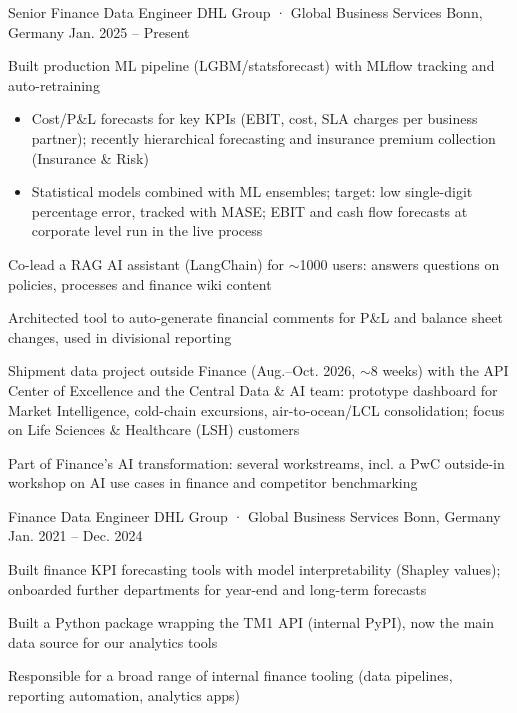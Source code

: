 \documentclass[11pt, a4paper]{awesome-cv}
\begin{document}
\makecvheader


\begin{cventries}
\cventry
  {Senior Finance Data Engineer}
  {DHL Group · Global Business Services}
  {Bonn, Germany}
  {Jan. 2025 -- Present}
  {
    \begin{cvitems}
      \item {Built production ML pipeline (LGBM/statsforecast) with MLflow tracking and auto-retraining}
        \begin{itemize}
          \item{Cost/P\&L forecasts for key KPIs (EBIT, cost, SLA charges per business partner); recently hierarchical forecasting and insurance premium collection (Insurance \& Risk)}
          \item{Statistical models combined with ML ensembles; target: low single-digit percentage error, tracked with MASE; EBIT and cash flow forecasts at corporate level run in the live process}
        \end{itemize}
      \item {Co-lead a RAG AI assistant (LangChain) for $\sim$1000 users: answers questions on policies, processes and finance wiki content}
      \item {Architected tool to auto-generate financial comments for P\&L and balance sheet changes, used in divisional reporting}
      \item {Shipment data project outside Finance (Aug.--Oct. 2026, $\sim$8 weeks) with the API Center of Excellence and the Central Data \& AI team: prototype dashboard for Market Intelligence, cold-chain excursions, air-to-ocean/LCL consolidation; focus on Life Sciences \& Healthcare (LSH) customers}
      \item {Part of Finance's AI transformation: several workstreams, incl. a PwC outside-in workshop on AI use cases in finance and competitor benchmarking}
    \end{cvitems}
  }

  \vspace{1.0em}

  \cventry
  {Finance Data Engineer}
  {DHL Group · Global Business Services}
  {Bonn, Germany}
  {Jan. 2021 -- Dec. 2024}
  {
    \begin{cvitems}
      \item {Built finance KPI forecasting tools with model interpretability (Shapley values); onboarded further departments for year-end and long-term forecasts}
      \item {Built a Python package wrapping the TM1 API (internal PyPI), now the main data source for our analytics tools}
      \item {Responsible for a broad range of internal finance tooling (data pipelines, reporting automation, analytics apps)}
    \end{cvitems}
  }


\end{cventries}
\end{document}

